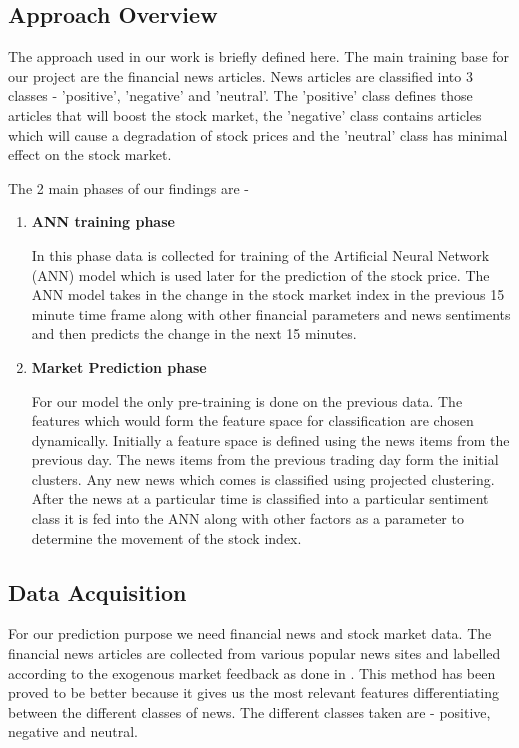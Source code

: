 \documentclass[review,twocolumn,5p]{elsarticle}
\begin{document}
\subsection{Approach Overview}
The approach used in our work is briefly defined here. The main training base for our project are the financial news articles. News articles are classified into 3 classes - 'positive', 'negative' and 'neutral'. The 'positive' class defines those articles that will boost the stock market, the 'negative' class contains articles which will cause a degradation of stock prices and the 'neutral' class has minimal effect on the stock market.

The 2 main phases of our findings are - 

\begin{enumerate}
\item \textbf{ANN training phase}

In this phase data is collected for training of the Artificial Neural Network (ANN) model which is used later for the prediction of the stock price. The ANN model takes in the change in the stock market index in the previous 15 minute time frame along with other financial parameters and news sentiments and then predicts the change in the next 15 minutes.

\item \textbf{Market Prediction phase}

For our model the only pre-training is done on the previous data. The features which would form the feature space for classification are chosen dynamically. Initially a feature space is defined using the news items from the previous day. The news items from the previous trading day form the initial clusters. Any new news which comes is classified using projected clustering. After the news at a particular time is classified into a particular sentiment class it is fed into the ANN along with other factors as a parameter to determine the movement of the stock index.
\end{enumerate}

\subsection{Data Acquisition}
\label{sec:ann_parameters}
For our prediction purpose we need financial news and stock market data. The financial news articles are collected from various popular news sites and labelled according to the exogenous market feedback as done in \cite{Hagenau:2013}. This method has been proved to be better because it gives us the most relevant features differentiating between the different classes of news. The different classes taken are - positive, negative and neutral. 
\end{document}
